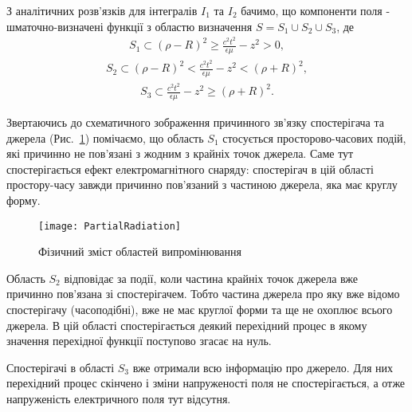 З аналітичних розв'язків для інтегралів $ I_1 $ та $ I_2 $ бачимо, що 
компоненти поля - шматочно-визначені функції з областю визначення 
$ S = S_1 \cup S_2 \cup S_3 $, де
%
\begin{equation} \begin{aligned} \label{eq:s1zone}
S_1 \subset (\rho - R)^2 \ge \frac{c^2t^2}{\epsilon \mu} - z^2 > 0,
\end{aligned} \end{equation}
%
\begin{equation} \begin{aligned} \label{eq:s2zone}
S_2 \subset (\rho - R)^2 < \frac{c^2t^2}{\epsilon \mu} - z^2 < (\rho + R)^2,
\end{aligned} \end{equation}
%
\begin{equation} \begin{aligned} \label{eq:s3zone}
S_3 \subset \frac{c^2t^2}{\epsilon \mu} - z^2 \ge (\rho + R)^2.
\end{aligned} \end{equation}

Звертаючись до схематичного зображення причинного зв'язку спостерігача та 
джерела (Рис.~\ref{fig:part_rad}) помічаємо, що область $ S_1 $ стосується 
просторово-часових подій, які причинно не пов'язані з жодним з крайніх точок 
джерела. Саме тут спостерігається ефект електромагнітного снаряду: 
спостерігач  в цій області простору-часу завжди причинно пов'язаний з 
частиною джерела, яка має круглу форму.

\begin{figure}[h] \begin{center}
\texttt{[image: PartialRadiation]}
\caption{Фізичний зміст областей випромінювання} \label{fig:part_rad}
\end{center} \end{figure}

Область $ S_2 $ відповідає за події, коли частина крайніх точок джерела вже 
причинно пов'язана зі спостерігачем. Тобто частина джерела про яку вже відомо
спостерігачу (часоподібні), вже не має круглої форми та ще не охоплює 
всього джерела. В цій області спостерігається деякий перехідний процес в
якому значення перехідної функції поступово згасає на нуль.

Спостерігачі в області $ S_3 $ вже отримали всю інформацію про джерело. Для
них перехідний процес скінчено і зміни напруженості поля не спостерігається,
а отже напруженість електричного поля тут відсутня.

